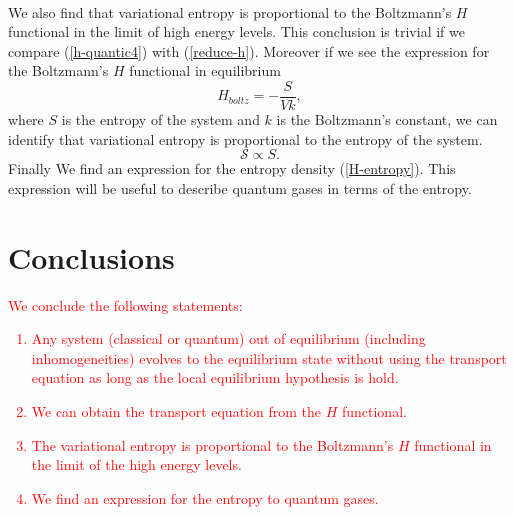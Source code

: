 \documentclass{article}
\newcommand{\Ss}{\mathcal{S}}
\begin{document}
{\\
We also find that variational entropy is proportional to the Boltzmann's $H$ functional in the limit of high energy levels. This conclusion is trivial if we compare (\ref{h-quantic4}) with (\ref{reduce-h}). Moreover if we see the expression for the Boltzmann's $H$ functional in equilibrium
\begin{equation}
    H_{boltz}=-\frac{S}{Vk},
\end{equation}
where $S$ is the entropy of the system and $k$ is the Boltzmann's constant, we can identify that variational entropy is proportional to the entropy of the system.\\
\begin{equation}
    \Ss\propto S.
\end{equation}
Finally We find an expression for the entropy density (\ref{H-entropy}). This expression will be useful to describe quantum gases in terms of the entropy.}


\section{Conclusions}
\textcolor{red}{We conclude the following statements:\\
\begin{enumerate}
    \item Any system (classical or quantum) out of equilibrium (including inhomogeneities) evolves to the equilibrium state without using the transport equation as long as the local equilibrium hypothesis is hold.
    \item We can obtain the transport equation from the $H$ functional.
    \item The variational entropy is proportional to the Boltzmann's $H$ functional in the limit of the high energy levels.
    \item We find an expression for the entropy to quantum gases.
    \end{enumerate}
  }
  
\clearpage
\end{document}
